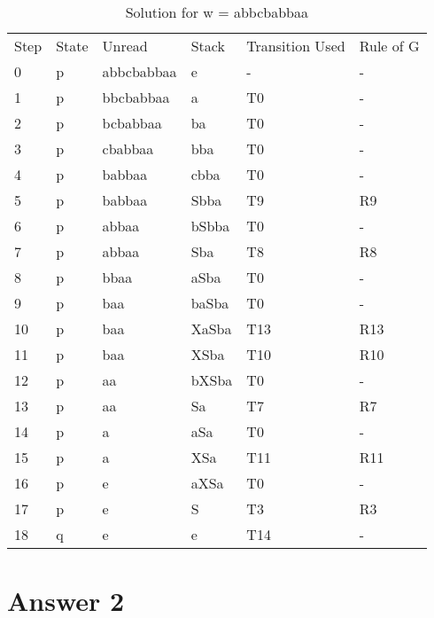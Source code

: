 \documentclass[12pt]{article}
\begin{document}
\begin{table}[H]
\centering
\caption{Solution for w = abbcbabbaa}
\begin{tabular}{llllll}
Step & State & Unread     & Stack & Transition Used & Rule of G \\
0    & p     & abbcbabbaa & e     & -               & -         \\
1    & p     & bbcbabbaa  & a     & T0              & -         \\
2    & p     & bcbabbaa   & ba    & T0              & -         \\
3    & p     & cbabbaa    & bba   & T0              & -         \\
4    & p     & babbaa     & cbba  & T0              & -         \\
5    & p     & babbaa     & Sbba  & T9              & R9        \\
6    & p     & abbaa      & bSbba & T0              & -         \\
7    & p     & abbaa      & Sba   & T8              & R8        \\
8    & p     & bbaa       & aSba  & T0              & -         \\
9    & p     & baa        & baSba & T0              & -         \\
10   & p     & baa        & XaSba & T13             & R13       \\
11   & p     & baa        & XSba  & T10             & R10       \\
12   & p     & aa         & bXSba & T0              & -         \\
13   & p     & aa         & Sa    & T7              & R7        \\
14   & p     & a          & aSa   & T0              & -         \\
15   & p     & a          & XSa   & T11             & R11       \\
16   & p     & e          & aXSa  & T0              & -         \\
17   & p     & e          & S     & T3              & R3        \\
18   & q     & e          & e     & T14             & -        
\end{tabular}
\end{table}

\section*{Answer 2}
\end{document}
